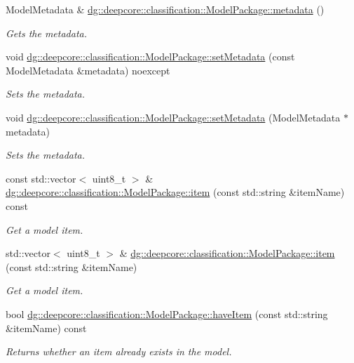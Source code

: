 \begin{DoxyCompactItemize}
Model\+Metadata \& \hyperlink{group___classification_module_ga1d2576e90ac787ae30dffb0920d48462}{dg\+::deepcore\+::classification\+::\+Model\+Package\+::metadata} ()
\begin{DoxyCompactList}\small\item\em Gets the metadata. \end{DoxyCompactList}\item 
void \hyperlink{group___classification_module_ga240a62f23ad36c3eac6b7c91d90708d7}{dg\+::deepcore\+::classification\+::\+Model\+Package\+::set\+Metadata} (const Model\+Metadata \&metadata) noexcept
\begin{DoxyCompactList}\small\item\em Sets the metadata. \end{DoxyCompactList}\item 
void \hyperlink{group___classification_module_ga24a23bab6f1de6810b2b38c67b8eac78}{dg\+::deepcore\+::classification\+::\+Model\+Package\+::set\+Metadata} (Model\+Metadata $\ast$metadata)
\begin{DoxyCompactList}\small\item\em Sets the metadata. \end{DoxyCompactList}\item 
const std\+::vector$<$ uint8\+\_\+t $>$ \& \hyperlink{group___classification_module_ga897ce1fbc0efb85360a6cc5ab958209d}{dg\+::deepcore\+::classification\+::\+Model\+Package\+::item} (const std\+::string \&item\+Name) const 
\begin{DoxyCompactList}\small\item\em Get a model item. \end{DoxyCompactList}\item 
std\+::vector$<$ uint8\+\_\+t $>$ \& \hyperlink{group___classification_module_ga8a80cf25a3e493dcbb32c6fcdfc1807b}{dg\+::deepcore\+::classification\+::\+Model\+Package\+::item} (const std\+::string \&item\+Name)
\begin{DoxyCompactList}\small\item\em Get a model item. \end{DoxyCompactList}\item 
bool \hyperlink{group___classification_module_gad0a0e3e9762e66bbd6b03d70011df25e}{dg\+::deepcore\+::classification\+::\+Model\+Package\+::have\+Item} (const std\+::string \&item\+Name) const 
\begin{DoxyCompactList}\small\item\em Returns whether an item already exists in the model. \end{DoxyCompactList}\item 

\end{DoxyCompactItemize}
